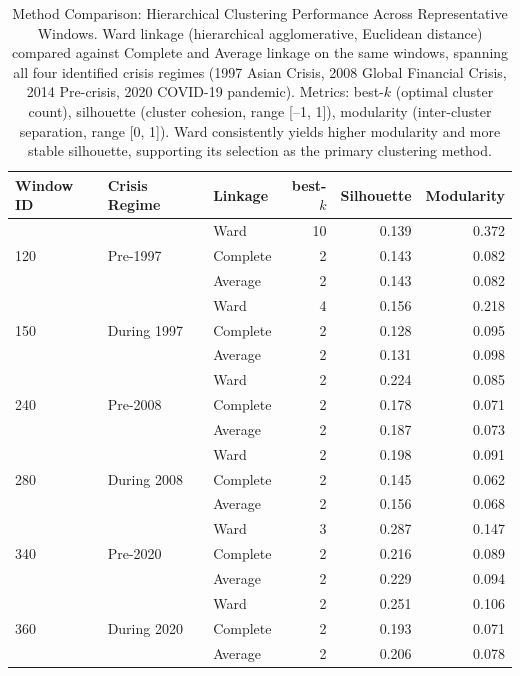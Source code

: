 
\begin{table}[width=\textwidth,pos=h]
\centering
\small
\caption{Method Comparison: Hierarchical Clustering Performance Across Representative Windows. Ward linkage (hierarchical agglomerative, Euclidean distance) compared against Complete and Average linkage on the same windows, spanning all four identified crisis regimes (1997 Asian Crisis, 2008 Global Financial Crisis, 2014 Pre-crisis, 2020 COVID-19 pandemic). Metrics: best-$k$ (optimal cluster count), silhouette (cluster cohesion, range [--1, 1]), modularity (inter-cluster separation, range [0, 1]). Ward consistently yields higher modularity and more stable silhouette, supporting its selection as the primary clustering method.}
\label{tab:method-comparison}
\begin{tabular*}{\tblwidth}{@{}lllrrr@{}}
\toprule
\textbf{Window ID} & \textbf{Crisis Regime} & \textbf{Linkage} & \textbf{best-$k$} & \textbf{Silhouette} & \textbf{Modularity} \\
\midrule
\multirow{3}{*}{120} & \multirow{3}{*}{Pre-1997} & Ward & 10 & 0.139 & 0.372 \\
& & Complete & 2 & 0.143 & 0.082 \\
& & Average & 2 & 0.143 & 0.082 \\
\midrule
\multirow{3}{*}{150} & \multirow{3}{*}{During 1997} & Ward & 4 & 0.156 & 0.218 \\
& & Complete & 2 & 0.128 & 0.095 \\
& & Average & 2 & 0.131 & 0.098 \\
\midrule
\multirow{3}{*}{240} & \multirow{3}{*}{Pre-2008} & Ward & 2 & 0.224 & 0.085 \\
& & Complete & 2 & 0.178 & 0.071 \\
& & Average & 2 & 0.187 & 0.073 \\
\midrule
\multirow{3}{*}{280} & \multirow{3}{*}{During 2008} & Ward & 2 & 0.198 & 0.091 \\
& & Complete & 2 & 0.145 & 0.062 \\
& & Average & 2 & 0.156 & 0.068 \\
\midrule
\multirow{3}{*}{340} & \multirow{3}{*}{Pre-2020} & Ward & 3 & 0.287 & 0.147 \\
& & Complete & 2 & 0.216 & 0.089 \\
& & Average & 2 & 0.229 & 0.094 \\
\midrule
\multirow{3}{*}{360} & \multirow{3}{*}{During 2020} & Ward & 2 & 0.251 & 0.106 \\
& & Complete & 2 & 0.193 & 0.071 \\
& & Average & 2 & 0.206 & 0.078 \\
\bottomrule
\end{tabular*}
\end{table}
